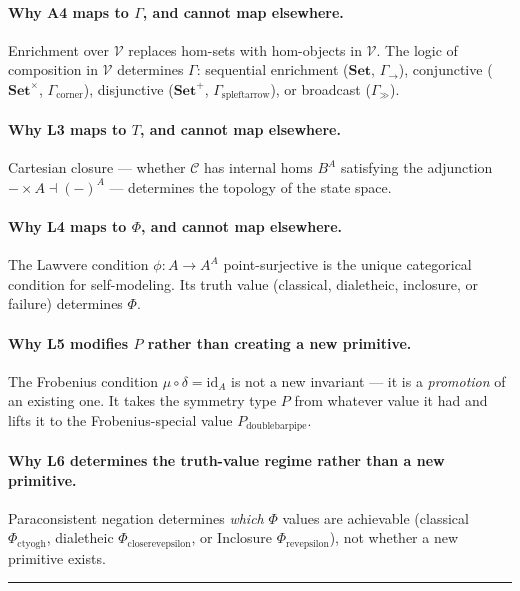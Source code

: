 \documentclass[12pt,a4paper]{article}
\begin{document}
\paragraph{Why A4 maps to $\Gamma$, and cannot map elsewhere.}
Enrichment over $\mathcal{V}$ replaces hom-sets with hom-objects in $\mathcal{V}$. The logic of composition in $\mathcal{V}$ determines $\Gamma$: sequential enrichment ($\mathbf{Set}$, $\Gamma_\to$), conjunctive ($\mathbf{Set}^\times$, $\Gamma_{\text{corner}}$), disjunctive ($\mathbf{Set}^+$, $\Gamma_{\text{spleftarrow}}$), or broadcast ($\Gamma_{\gg}$).

\paragraph{Why L3 maps to $T$, and cannot map elsewhere.}
Cartesian closure --- whether $\mathcal{C}$ has internal homs $B^A$ satisfying the adjunction $-\times A \dashv (-)^A$ --- determines the topology of the state space.

\paragraph{Why L4 maps to $\Phi$, and cannot map elsewhere.}
The Lawvere condition $\phi: A \to A^A$ point-surjective is the unique categorical condition for self-modeling. Its truth value (classical, dialetheic, inclosure, or failure) determines $\Phi$.

\paragraph{Why L5 modifies $P$ rather than creating a new primitive.}
The Frobenius condition $\mu \circ \delta = \text{id}_A$ is not a new invariant --- it is a \emph{promotion} of an existing one. It takes the symmetry type $P$ from whatever value it had and lifts it to the Frobenius-special value $P_{\text{doublebarpipe}}$.

\paragraph{Why L6 determines the truth-value regime rather than a new primitive.}
Paraconsistent negation determines \emph{which} $\Phi$ values are achievable (classical $\Phi_{\text{ctyogh}}$, dialetheic $\Phi_{\text{closerevepsilon}}$, or Inclosure $\Phi_{\text{revepsilon}}$), not whether a new primitive exists.

\begin{center}
\rule{0.5\textwidth}{0.4pt}
\end{center}
\end{document}
